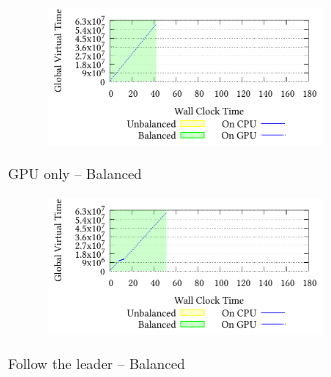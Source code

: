 \documentclass[8pt]{article}
\begin{document}
\setcounter{figure}{1}
\renewcommand{\thefigure}{\arabic{figure}d}
\begin{figure}[!h]
\centering
\begin{subfigure}[b]{\mysize}
\centering
\includegraphics[width=0.8\textwidth]{figures_original/balanced/2.processed.pdf}
\renewcommand{\thesubfigure}{Original}
\caption{}
\end{subfigure}
\begin{subfigure}[b]{\mysize}
\centering
{}
\renewcommand{\thesubfigure}{Reproduced}
\caption{}
\end{subfigure}
\caption{GPU only – Balanced}
\end{figure}



\setcounter{figure}{1}
\renewcommand{\thefigure}{\arabic{figure}g}
\begin{figure}[!h]
\centering
\begin{subfigure}[b]{\mysize}
\centering
\includegraphics[width=0.8\textwidth]{figures_original/balanced/3.processed.pdf}
\renewcommand{\thesubfigure}{Original}
\caption{}
\end{subfigure}
\begin{subfigure}[b]{\mysize}
\centering
{}
\renewcommand{\thesubfigure}{Reproduced}
\caption{}
\end{subfigure}
\caption{Follow the leader – Balanced}
\end{figure}
\end{document}
